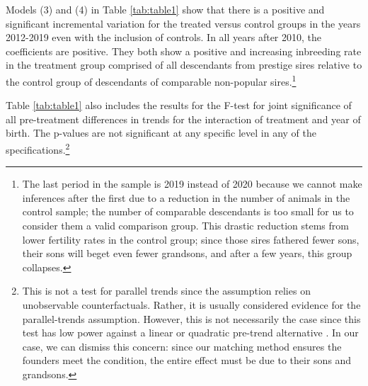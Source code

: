 \documentclass[12pt,letterpaper]{article}
\begin{document}
Models (3) and (4) in Table \ref{tab:table1} show that there is a positive and significant incremental variation for the treated versus control groups in the years 2012-2019 even with the inclusion of controls. In all years after 2010, the coefficients are positive. They both show a positive and increasing inbreeding rate in the treatment group comprised of all descendants from prestige sires relative to the control group of descendants of comparable non-popular sires.\footnote{The last period in the sample is 2019 instead of 2020 because we cannot make inferences after the first due to a reduction in the number of animals in the control sample; the number of comparable descendants is too small for us to consider them a valid comparison group. This drastic reduction stems from lower fertility rates in the control group; since those sires fathered fewer sons, their sons will beget even fewer grandsons, and after a few years, this group collapses.} 

Table \ref{tab:table1} also includes the results for the F-test for joint significance of all pre-treatment differences in trends for the interaction of treatment and year of birth. The p-values are not significant at any specific level in any of the specifications.\footnote{This is not a test for parallel trends since the assumption relies on unobservable counterfactuals. Rather, it is usually considered evidence for the parallel-trends assumption. However, this is not necessarily the case since this test has low power against a linear or quadratic pre-trend alternative \citep{Roth2022}. In our case, we can dismiss this concern: since our matching method ensures the founders meet the condition, the entire effect must be due to their sons and grandsons.}




\end{document}
